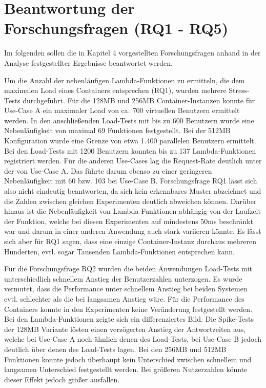 \section{Beantwortung der Forschungsfragen (RQ1 - RQ5)}
Im folgenden sollen die in Kapitel 4 vorgestellten Forschungsfragen anhand in der Analyse festgestellter Ergebnisse beantwortet werden.

Um die Anzahl der nebenläufigen Lambda-Funktionen zu ermitteln, die dem maximalen Load eines Containers entsprechen (RQ1), wurden mehrere Stress-Tests durchgeführt. Für die 128MB und 256MB Container-Instanzen konnte für Use-Case A ein maximaler Load von ca. 700 virtuellen Benutzern ermittelt werden. In den anschließenden Load-Tests mit bis zu 600 Benutzern wurde eine Nebenläufigkeit von maximal 69 Funktionen festgestellt. Bei der 512MB Konfiguration wurde eine Grenze von etwa 1.400 parallelen Benutzern ermittelt. Bei den Load-Tests mit 1200 Benutzern konnten bis zu 137 Lambda-Funktionen registriert werden. 
Für die anderen Use-Cases lag die Request-Rate deutlich unter der von Use-Case A. Das führte darum ebenso zu einer geringeren Nebenläufigkeit mit 60 bzw. 103 bei Use-Case B. 
Forschungsfrage RQ1 lässt sich also nicht eindeutig beantworten, da sich kein erkennbares Muster abzeichnet und die Zahlen zwischen gleichen Experimenten deutlich abweichen können. Darüber hinaus ist die Nebenläufigkeit von Lambda-Funktionen abhängig von der Laufzeit der Funktion, welche bei diesen Experimenten auf mindestens 50ms beschränkt war und darum in einer anderen Anwendung auch stark variieren könnte. Es lässt sich aber für RQ1 sagen, dass eine einzige Container-Instanz durchaus mehreren Hunderten, evtl. sogar Tausenden Lambda-Funktionen entsprechen kann.

Für die Forschungsfrage RQ2 wurden die beiden Anwendungen Load-Tests mit unterschiedlich schnellem Anstieg der Benutzerzahlen unterzogen. Es wurde vermutet, dass die Performance unter schnellem Anstieg bei beiden Systemen evtl. schlechter als die bei langsamen Anstieg wäre. Für die Performance des Containers konnte in den Experimenten keine Veränderung festgestellt werden. Bei den Lambda-Funktionen zeigte sich ein differenziertes Bild. Die Spike-Tests der 128MB Variante lösten einen verzögerten Anstieg der Antwortzeiten aus, welche bei Use-Case A noch ähnlich denen des Load-Tests, bei Use-Case B jedoch deutlich über denen des Load-Tests lagen. Bei den 256MB und 512MB Funktionen konnte jedoch überhaupt kein Unterschied zwischen schnellem und langsamen Unterschied festgestellt werden. Bei größeren Nutzerzahlen könnte dieser Effekt jedoch größer ausfallen.

